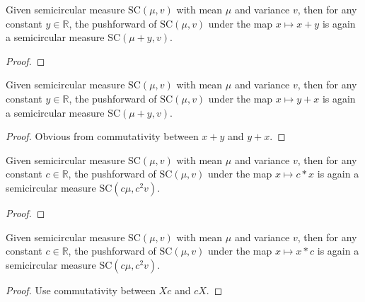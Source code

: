 
\begin{lemma}\label{lem:semicircleReal_map_add_const}
  \notready
  Given semicircular measure $\mathrm{SC}(\mu, v)$ with mean $\mu$ and variance $v$, then for any constant $y \in \mathbb{R}$, the pushforward
  of $\mathrm{SC}(\mu, v)$ under the map $x \mapsto x + y$ is again a semicircular measure $\mathrm{SC}(\mu + y, v)$. 
  \begin{proof}
  \end{proof}
\end{lemma}



\begin{lemma}\label{lem:semicircleReal_map_const_add}
  \mathlibok
  Given semicircular measure $\mathrm{SC}(\mu, v)$ with mean $\mu$ and variance $v$, then for any constant $y \in \mathbb{R}$, the pushforward
  of $\mathrm{SC}(\mu, v)$ under the map $x \mapsto y + x$ is again a semicircular measure $\mathrm{SC}(\mu + y, v)$. 
  \begin{proof}
    Obvious from commutativity between $x + y$ and $y + x$.
  \end{proof}
\end{lemma}



\begin{lemma}\label{lem:semicircleReal_map_const_mul}
  \notready
    Given semicircular measure $\mathrm{SC}(\mu, v)$ with mean $\mu$ and variance $v$, then for any constant $c \in \mathbb{R}$, the pushforward
  of $\mathrm{SC}(\mu, v)$ under the map $x \mapsto c * x$ is again a semicircular measure $\mathrm{SC}(c\mu, c^2v)$. 
  \begin{proof}
  \end{proof}
\end{lemma}



\begin{lemma}\label{lem:semicircleReal_map_mul_const}
  \mathlibok
   Given semicircular measure $\mathrm{SC}(\mu, v)$ with mean $\mu$ and variance $v$, then for any constant $c \in \mathbb{R}$, the pushforward
  of $\mathrm{SC}(\mu, v)$ under the map $x \mapsto x * c$ is again a semicircular measure $\mathrm{SC}(c\mu, c^2v)$. 
  \begin{proof}
    Use commutativity between $Xc$ and $cX$.
  \end{proof}
\end{lemma}



